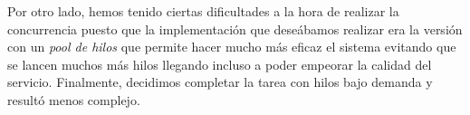 \documentclass[10pt, spanish, pdftex]{template/UC3M_document}
\begin{document}
Por otro lado, hemos tenido ciertas dificultades a la hora de realizar la concurrencia puesto que la implementación que deseábamos realizar era la versión con un \textit{pool de hilos} que permite hacer mucho más eficaz el sistema evitando que se lancen muchos más hilos llegando incluso a poder empeorar la calidad del servicio. Finalmente, decidimos completar la tarea con hilos bajo demanda y resultó menos complejo.
\end{document}
